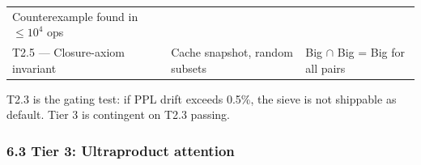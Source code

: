 \documentclass[
  11pt,
]{article}
\begin{document}
\begin{longtable}[]{@{}lll@{}}
\begin{minipage}[t]{0.49\columnwidth}
Counterexample found in \(\le 10^4\) ops\strut
\end{minipage}\tabularnewline
\begin{minipage}[t]{0.18\columnwidth}\raggedright
T2.5 --- Closure-axiom invariant\strut
\end{minipage} & \begin{minipage}[t]{0.24\columnwidth}\raggedright
Cache snapshot, random subsets\strut
\end{minipage} & \begin{minipage}[t]{0.49\columnwidth}\raggedright
Big \(\cap\) Big = Big for all pairs\strut
\end{minipage}\tabularnewline
\bottomrule
\end{longtable}

T2.3 is the gating test: if PPL drift exceeds 0.5\%, the sieve is not
shippable as default. Tier 3 is contingent on T2.3 passing.

\hypertarget{tier-3-ultraproduct-attention}{%
\subsubsection{6.3 Tier 3: Ultraproduct
attention}\label{tier-3-ultraproduct-attention}}
\end{document}
